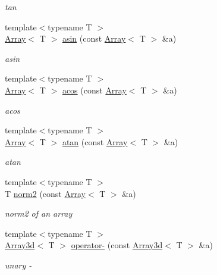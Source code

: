 \begin{DoxyCompactItemize}
\begin{DoxyCompactList}\small\item\em tan \end{DoxyCompactList}\item 
{\footnotesize template$<$typename T $>$ }\\\mbox{\hyperlink{classXMLArray_1_1Array}{Array}}$<$ T $>$ \mbox{\hyperlink{namespaceXMLArray_ad218b241e0898d122bf3c722a16a1741}{asin}} (const \mbox{\hyperlink{classXMLArray_1_1Array}{Array}}$<$ T $>$ \&a)
\begin{DoxyCompactList}\small\item\em asin \end{DoxyCompactList}\item 
{\footnotesize template$<$typename T $>$ }\\\mbox{\hyperlink{classXMLArray_1_1Array}{Array}}$<$ T $>$ \mbox{\hyperlink{namespaceXMLArray_a8fa6c5656b58ed00c7cff9fcdf6dbb96}{acos}} (const \mbox{\hyperlink{classXMLArray_1_1Array}{Array}}$<$ T $>$ \&a)
\begin{DoxyCompactList}\small\item\em acos \end{DoxyCompactList}\item 
{\footnotesize template$<$typename T $>$ }\\\mbox{\hyperlink{classXMLArray_1_1Array}{Array}}$<$ T $>$ \mbox{\hyperlink{namespaceXMLArray_a961e9e4f133045c069214c97704aa349}{atan}} (const \mbox{\hyperlink{classXMLArray_1_1Array}{Array}}$<$ T $>$ \&a)
\begin{DoxyCompactList}\small\item\em atan \end{DoxyCompactList}\item 
{\footnotesize template$<$typename T $>$ }\\T \mbox{\hyperlink{namespaceXMLArray_a86ac84a2d19bf404766498fc122af036}{norm2}} (const \mbox{\hyperlink{classXMLArray_1_1Array}{Array}}$<$ T $>$ \&a)
\begin{DoxyCompactList}\small\item\em norm2 of an array \end{DoxyCompactList}\item 
{\footnotesize template$<$typename T $>$ }\\\mbox{\hyperlink{classXMLArray_1_1Array3d}{Array3d}}$<$ T $>$ \mbox{\hyperlink{namespaceXMLArray_abf0b390db9be6de84a10b451c1dfc18f}{operator-\/}} (const \mbox{\hyperlink{classXMLArray_1_1Array3d}{Array3d}}$<$ T $>$ \&a)
\begin{DoxyCompactList}\small\item\em unary -\/ \end{DoxyCompactList}\item 

\end{DoxyCompactItemize}
